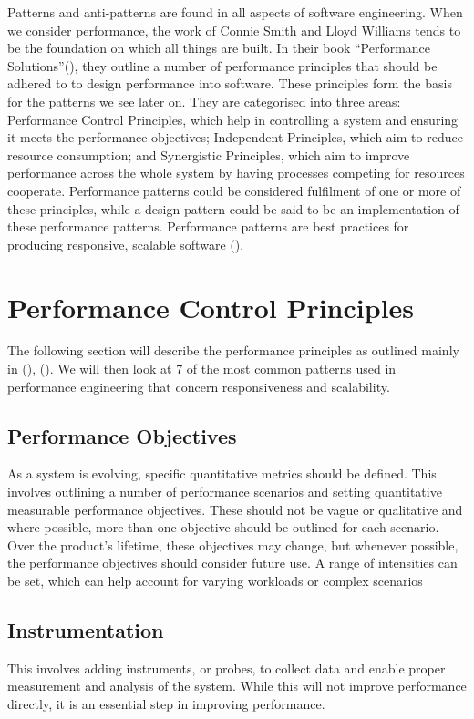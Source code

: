 \documentclass[a4paper,11pt,article,oneside]{memoir}
\begin{document}
	Patterns and anti-patterns are found in all aspects of software engineering. When we consider performance, the work of Connie Smith and Lloyd Williams tends to be the foundation on which all things are built. In their book “Performance Solutions”(\cite{smith2001performance}), they outline a number of performance principles that should be adhered to to design performance into software. These principles form the basis for the patterns we see later on. They are categorised into three areas: Performance Control Principles, which help in controlling a system and ensuring it meets the performance objectives; Independent Principles, which aim to reduce resource consumption;  and Synergistic Principles, which aim to improve performance across the whole system by having processes competing for resources cooperate. Performance patterns could be considered fulfilment of one or more of these principles, while a design pattern could be said to be an implementation of these performance patterns. Performance patterns are best practices for producing responsive, scalable software (\cite{smith2001performance}). 
	
	\section{Performance Control Principles}
	The following section will describe the performance principles as outlined mainly in (\cite{smith2001performance}), (\cite{smith1988applying}). We will then look at 7 of the most common patterns used in performance engineering that concern responsiveness and scalability.
	
	\subsection{Performance Objectives}
	As a system is evolving, specific quantitative metrics should be defined. This involves outlining a number of performance scenarios and setting quantitative measurable performance objectives. These should not be vague or qualitative and where possible, more than one objective should be outlined for each scenario. Over the product’s lifetime, these objectives may change, but whenever possible, the performance objectives should consider future use. A range of intensities can be set, which can help account for varying workloads or complex scenarios
	\subsection{Instrumentation}
	This involves adding instruments, or probes, to collect data and enable proper measurement and analysis of the system. While this will not improve performance directly, it is an essential step in improving performance.
	
\end{document}
